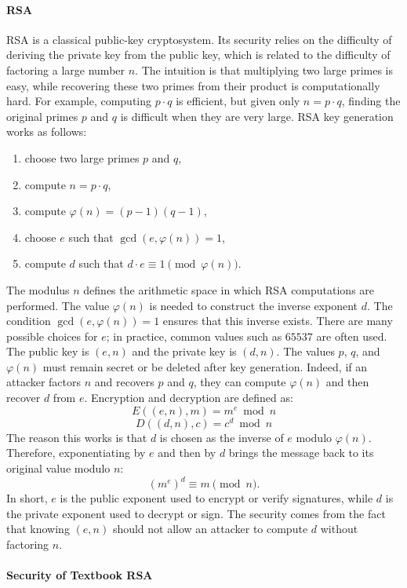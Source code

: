 \paragraph{RSA} RSA is a classical public-key cryptosystem. Its security relies on the difficulty of deriving the private key from the public key, which is related to the difficulty of factoring a large number $n$. The intuition is that multiplying two large primes is easy, while recovering these two primes from their product is computationally hard. For example, computing $p \cdot q$ is efficient, but given only $n = p \cdot q$, finding the original primes $p$ and $q$ is difficult when they are very large. RSA key generation works as follows: \begin{enumerate} \item choose two large primes $p$ and $q$, \item compute $n = p \cdot q$, \item compute $\varphi(n) = (p-1)(q-1)$, \item choose $e$ such that $\gcd(e,\varphi(n)) = 1$, \item compute $d$ such that $d \cdot e \equiv 1 \pmod{\varphi(n)}$. \end{enumerate} The modulus $n$ defines the arithmetic space in which RSA computations are performed. The value $\varphi(n)$ is needed to construct the inverse exponent $d$. The condition $\gcd(e,\varphi(n)) = 1$ ensures that this inverse exists. There are many possible choices for $e$; in practice, common values such as $65537$ are often used. The public key is $(e,n)$ and the private key is $(d,n)$. The values $p$, $q$, and $\varphi(n)$ must remain secret or be deleted after key generation. Indeed, if an attacker factors $n$ and recovers $p$ and $q$, they can compute $\varphi(n)$ and then recover $d$ from $e$. Encryption and decryption are defined as: \[ E((e,n),m) = m^e \bmod n \] \[ D((d,n),c) = c^d \bmod n \] The reason this works is that $d$ is chosen as the inverse of $e$ modulo $\varphi(n)$. Therefore, exponentiating by $e$ and then by $d$ brings the message back to its original value modulo $n$: \[ (m^e)^d \equiv m \pmod n. \] In short, $e$ is the public exponent used to encrypt or verify signatures, while $d$ is the private exponent used to decrypt or sign. The security comes from the fact that knowing $(e,n)$ should not allow an attacker to compute $d$ without factoring $n$.
\paragraph{Security of Textbook RSA}


